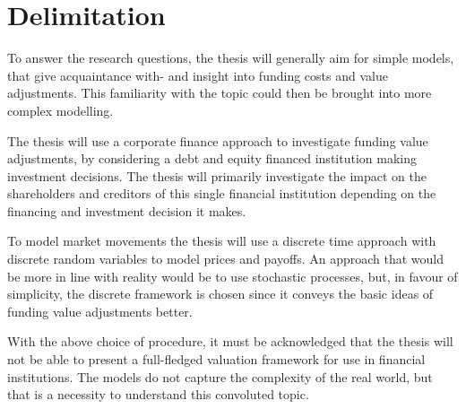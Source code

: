 \documentclass[main.tex]{subfiles}
\begin{document}
    \section{Delimitation}

    To answer the research questions, the thesis will generally aim for simple models,
    that give acquaintance with- and insight into funding costs and value adjustments.
    This familiarity with the topic could then be brought into more complex modelling.

    The thesis will use a corporate finance approach to investigate funding value adjustments,
    by considering a debt and equity financed institution making investment decisions.
    The thesis will primarily investigate the impact on the shareholders and creditors 
    of this single financial institution depending on the financing and investment decision it makes.

    To model market movements the thesis will use a discrete time approach 
    with discrete random variables to model prices and payoffs.
    An approach that would be more in line with reality would be to use stochastic processes,
    but, in favour of simplicity, the discrete framework is chosen 
    since it conveys the basic ideas of funding value adjustments better.

    With the above choice of procedure, it must be acknowledged that the thesis will not be able to
    present a full-fledged valuation framework for use in financial institutions.
    The models do not capture the complexity of the real world,
    but that is a necessity to understand this convoluted topic.
\end{document}
